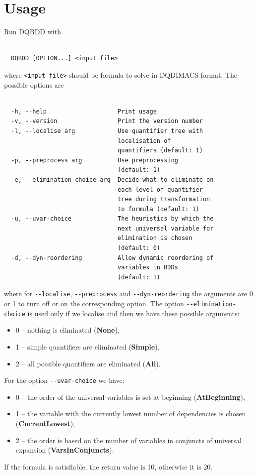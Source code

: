 \documentclass[
  digital, %
  color,
  twoside, %
  table,   %
  nolof,     %
  nolot,     %
]{fithesis3}
\theoremstyle{definition}
\theoremstyle{remark}
\newcommand{\QEnone}{\textbf{None}}
\newcommand{\QEsimple}{\textbf{Simple}}
\newcommand{\QEall}{\textbf{All}}
\newcommand{\QUatbeginning}{\textbf{At\-Be\-gin\-ning}}
\newcommand{\QUcurrentlowest}{\textbf{CurrentLowest}}
\newcommand{\QUvarsinconjuncts}{\textbf{VarsInConjuncts}}
\begin{document}
\section{Usage}
Run DQBDD with
\begin{verbatim}

  DQBDD [OPTION...] <input file>

\end{verbatim}
where \verb|<input file>| should be formula to solve in DQDIMACS format. The possible options are
\begin{verbatim}

  -h, --help                    Print usage
  -v, --version                 Print the version number
  -l, --localise arg            Use quantifier tree with
                                localisation of
                                quantifiers (default: 1)
  -p, --preprocess arg          Use preprocessing
                                (default: 1)
  -e, --elimination-choice arg  Decide what to eliminate on
                                each level of quantifier
                                tree during transformation
                                to formula (default: 1)
  -u, --uvar-choice             The heuristics by which the
                                next universal variable for
                                elimination is chosen
                                (default: 0)
  -d, --dyn-reordering          Allow dynamic reordering of
                                variables in BDDs
                                (default: 1)

\end{verbatim}
where for \verb|--localise|, \verb|--preprocess| and \verb|--dyn-reordering| the arguments are 0 or 1 to turn off or on the corresponding option. The option \verb|--elimination-choice| is used only if we localise and then we have these possible arguments:
\begin{itemize}
    \item 0 -- nothing is eliminated (\QEnone{}),
    \item 1 -- simple quantifiers are eliminated (\QEsimple{}),
    \item 2 -- all possible quantifiers are eliminated (\QEall{}).
\end{itemize}
For the option \verb|--uvar-choice| we have:
\begin{itemize}
    \item 0 -- the order of the universal variables is set at beginning (\QUatbeginning{}),
    \item 1 -- the variable with the currently lowest number of dependencies is chosen (\QUcurrentlowest{}),
    \item 2 -- the order is based on the number of variables in conjuncts of universal expansion (\QUvarsinconjuncts{}).
\end{itemize}
If the formula is satisfiable, the return value is 10, otherwise it is 20.
\end{document}
